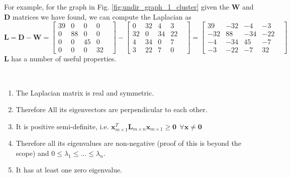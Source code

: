 \documentclass[a4paper]{article}
\begin{document}
For example, for the graph in Fig. \ref{fig:undir_graph_1_cluster} given the $\textbf{W}$ and $\textbf{D}$ matrices we have found, we can compute the Laplacian as
\[
\textbf{L} = \textbf{D}-\textbf{W} = \begin{bmatrix}
39 & 0& 0& 0\\
0& 88 &0 & 0&\\
0& 0& 45 &0\\
0& 0& 0& 32
\end{bmatrix}
- 
\begin{bmatrix}
0 & 32& 4& 3\\
32 & 0 &34 & 22&\\
4& 34& 0 &7\\
3& 22& 7& 0
\end{bmatrix}
=
\begin{bmatrix}
39 & -32& -4& -3\\
-32& 88 &-34 & -22&\\
-4& -34& 45 &-7\\
-3& -22& -7& 32
\end{bmatrix}
\]
$\textbf{L}$ has a number of useful properties.
\begin{corollary}\quad \\
\begin{enumerate}
    \item The Laplacian matrix is real and symmetric.
    \item Therefore All its eigenvectors are perpendicular to each other.
    \item It is positive semi-definite, i.e. $\textbf{x}_{m\times 1}^T \textbf{L}_{m \times n}\textbf{x}_{m\times 1}\geq \textbf{0} \ \ \forall \textbf{x}  \neq \textbf{0}$
    \item Therefore all its eigenvalues are non-negative (proof of this is beyond the scope) and $0 \leq \lambda_1 \leq ... \leq \lambda_n$.
    \item It has at least one zero eigenvalue.
\end{enumerate}
\end{corollary}
\end{document}
